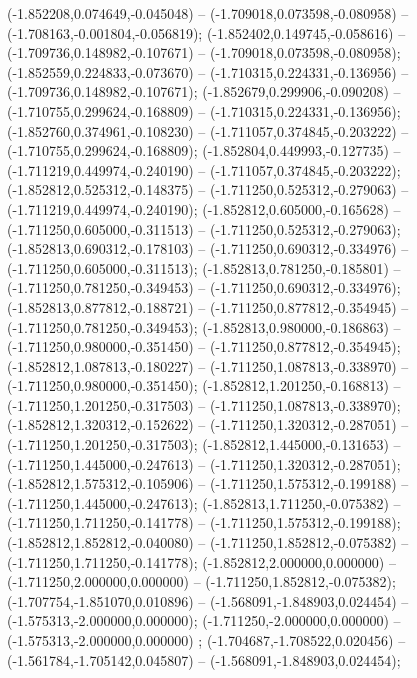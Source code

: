  (-1.852208,0.074649,-0.045048) -- (-1.709018,0.073598,-0.080958) -- (-1.708163,-0.001804,-0.056819);
 (-1.852402,0.149745,-0.058616) -- (-1.709736,0.148982,-0.107671) -- (-1.709018,0.073598,-0.080958);
 (-1.852559,0.224833,-0.073670) -- (-1.710315,0.224331,-0.136956) -- (-1.709736,0.148982,-0.107671);
 (-1.852679,0.299906,-0.090208) -- (-1.710755,0.299624,-0.168809) -- (-1.710315,0.224331,-0.136956);
 (-1.852760,0.374961,-0.108230) -- (-1.711057,0.374845,-0.203222) -- (-1.710755,0.299624,-0.168809);
 (-1.852804,0.449993,-0.127735) -- (-1.711219,0.449974,-0.240190) -- (-1.711057,0.374845,-0.203222);
 (-1.852812,0.525312,-0.148375) -- (-1.711250,0.525312,-0.279063) -- (-1.711219,0.449974,-0.240190);
 (-1.852812,0.605000,-0.165628) -- (-1.711250,0.605000,-0.311513) -- (-1.711250,0.525312,-0.279063);
 (-1.852813,0.690312,-0.178103) -- (-1.711250,0.690312,-0.334976) -- (-1.711250,0.605000,-0.311513);
 (-1.852813,0.781250,-0.185801) -- (-1.711250,0.781250,-0.349453) -- (-1.711250,0.690312,-0.334976);
 (-1.852813,0.877812,-0.188721) -- (-1.711250,0.877812,-0.354945) -- (-1.711250,0.781250,-0.349453);
 (-1.852813,0.980000,-0.186863) -- (-1.711250,0.980000,-0.351450) -- (-1.711250,0.877812,-0.354945);
 (-1.852812,1.087813,-0.180227) -- (-1.711250,1.087813,-0.338970) -- (-1.711250,0.980000,-0.351450);
 (-1.852812,1.201250,-0.168813) -- (-1.711250,1.201250,-0.317503) -- (-1.711250,1.087813,-0.338970);
 (-1.852812,1.320312,-0.152622) -- (-1.711250,1.320312,-0.287051) -- (-1.711250,1.201250,-0.317503);
 (-1.852812,1.445000,-0.131653) -- (-1.711250,1.445000,-0.247613) -- (-1.711250,1.320312,-0.287051);
 (-1.852812,1.575312,-0.105906) -- (-1.711250,1.575312,-0.199188) -- (-1.711250,1.445000,-0.247613);
 (-1.852813,1.711250,-0.075382) -- (-1.711250,1.711250,-0.141778) -- (-1.711250,1.575312,-0.199188);
 (-1.852812,1.852812,-0.040080) -- (-1.711250,1.852812,-0.075382) -- (-1.711250,1.711250,-0.141778);
 (-1.852812,2.000000,0.000000) -- (-1.711250,2.000000,0.000000) -- (-1.711250,1.852812,-0.075382);
 (-1.707754,-1.851070,0.010896) -- (-1.568091,-1.848903,0.024454) -- (-1.575313,-2.000000,0.000000);
 (-1.711250,-2.000000,0.000000) -- (-1.575313,-2.000000,0.000000) ;
 (-1.704687,-1.708522,0.020456) -- (-1.561784,-1.705142,0.045807) -- (-1.568091,-1.848903,0.024454);
